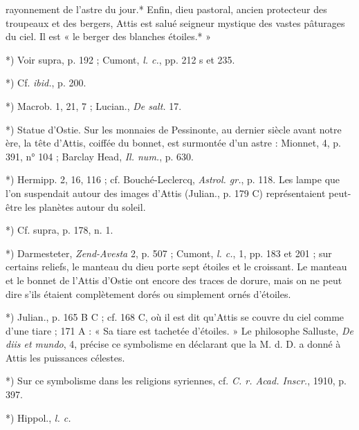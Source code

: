 \documentclass[a4paper, 11pt, oneside, polutonikogreek, french]{article}
\begin{document}
rayonnement de l'astre du jour.* Enfin, dieu pastoral, ancien protecteur des troupeaux et des bergers, Attis est salué seigneur mystique des vastes pâturages du ciel. Il est « le berger des blanches étoiles.* »

*) Voir supra, p. 192 ; Cumont, \emph{l. c.}, pp. 212 s et 235.

*) Cf. \emph{ibid.}, p. 200.

*) Macrob. 1, 21, 7 ; Lucian., \emph{De salt.} 17.

*) Statue d'Ostie. Sur les monnaies de Pessinonte, au dernier siècle avant notre ère, la tête d'Attis, coiffée du bonnet, est surmontée d'un astre : Mionnet, 4, p. 391, n° 104 ; Barclay Head, \emph{Il. num.}, p. 630.

*) Hermipp. 2, 16, 116 ; cf. Bouché-Leclercq, \emph{Astrol. gr.}, p. 118. Les lampe que l'on suspendait autour des images d'Attis (Julian., p. 179 C) représentaient peut-être les planètes autour du soleil.

*) Cf. supra, p. 178, n. 1.

*) Darmesteter, \emph{Zend-Avesta} 2, p. 507 ; Cumont, \emph{l. c.}, 1, pp. 183 et 201 ; sur certains reliefs, le manteau du dieu porte sept étoiles et le croissant. Le manteau et le bonnet de l'Attis d'Ostie ont encore des traces de dorure, mais on ne peut dire s'ils étaient complètement dorés ou simplement ornés d'étoiles.

*) Julian., p. 165 B C ; cf. 168 C, où il est dit qu'Attis se couvre du ciel comme d'une tiare ; 171 A : « Sa tiare est tachetée d'étoiles. » Le philosophe Salluste, \emph{De diis et mundo}, 4, précise ce symbolisme en déclarant que la M. d. D. a donné à Attis les puissances célestes.

*) Sur ce symbolisme dans les religions syriennes, cf. \emph{C. r. Acad. Inscr.}, 1910, p. 397.

*) Hippol., \emph{l. c.}
\end{document}
